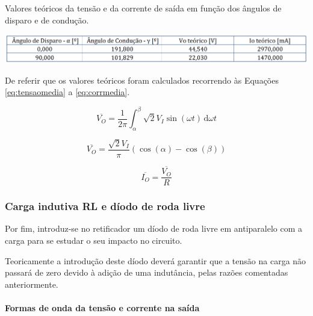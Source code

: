 \documentclass[a4paper,11pt]{article}
\numberwithin{equation}{section}
\begin{document}
\begin{table}[!htb]
	\centering
	\caption{Valores teóricos da tensão e da corrente de saída em função dos ângulos de disparo e de condução.}
	\vspace{-3mm}
	\includegraphics[width=0.9\linewidth]{teoricas/tabela3}
	\label{tab:tabela3}
\end{table}

De referir que os valores teóricos foram calculados recorrendo às Equações \ref{eq:tensaomedia} a \ref{eq:corrmedia}.

\begin{equation}
\label{eq:tensaomedia}
\overline{V_O} = \frac{1}{2\pi}\int_\alpha^\beta  \sqrt{2} V_I \sin(\omega t)\,\mathrm{d}\omega t
\end{equation}

\begin{equation}
\overline{V_O} = \frac{\sqrt{2}V_I}{\pi} (\cos(\alpha)-\cos(\beta))
\end{equation}

\begin{equation}
\label{eq:corrmedia}
\overline{I_O} = \frac{\overline{V_O}}{R}
\end{equation}


\subsubsection{Carga indutiva RL e díodo de roda livre}

Por fim, introduz-se no retificador um díodo de roda livre em antiparalelo com a carga para se estudar o seu impacto no circuito.

Teoricamente a introdução deste díodo deverá garantir que a tensão na carga não passará de zero devido à adição de uma indutância, pelas razões comentadas anteriormente.

\paragraph{Formas de onda da tensão e corrente na saída \label{parag:1}}\mbox{}\
\end{document}
